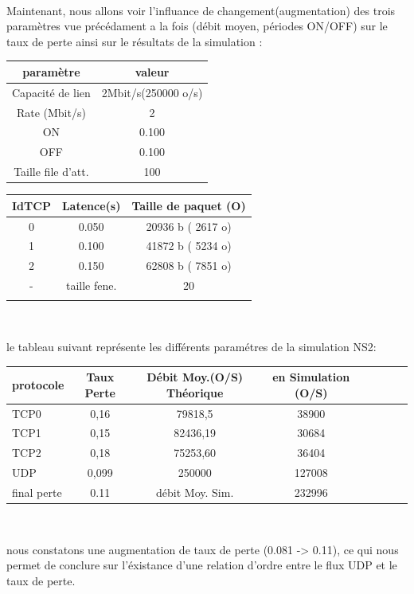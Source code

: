 \documentclass[a4paper]{report}
\theoremstyle{definition}
\begin{document}
\paragraph*{}
   Maintenant, nous allons voir l'influance de changement(augmentation)  des trois paramètres vue précédament a la fois (débit moyen, périodes ON/OFF) sur le taux de perte ainsi sur le résultats de la simulation : \\
   \begin{center}
   

\begin{tabular}{|c|c|}
\hline
 paramètre  & valeur \\ \hline
 
 Capacité de lien & 2Mbit/s(250000 o/s) \\ 
 Rate (Mbit/s) & 2 \\ 
 ON & 0.100  \\ 
 OFF & 0.100 \\ 
 Taille file d'att. & 100\\
\hline
\end{tabular}
\begin{tabular}{|c|c|c|}
\hline
 IdTCP  & Latence(s) & Taille de paquet (O) \\ \hline
 
 0 & 0.050 & 20936 b ( 2617 o)	 \\ 
 1 & 0.100 & 41872 b ( 5234 o)	 \\ 
 2 & 0.150 & 62808 b ( 7851 o)	 \\ 
 - & taille fene. & 20\\ 
 &&\\
\hline
\end{tabular}\\
   \end{center}
	le tableau suivant représente les différents paramétres de la simulation NS2:\\

\begin{center}


\begin{tabular}{|l|c|c|c|c|c|c|c|}
\hline
 protocole & Taux Perte & Débit Moy.(O/S) Théorique & en Simulation (O/S) \\ \hline
 TCP0 & 0,16 &  79818,5 &  38900     \\
 TCP1 & 0,15 &  82436,19 &  30684     \\ 
 TCP2 & 0,18 &  75253,60 &  36404     \\ 
 UDP  & 0,099 & 250000     &  127008 \\ 
 \hline
 final perte & 0.11  & débit Moy. Sim. & 232996   \\ 
\hline
\end{tabular}\\
\end{center}
nous constatons une augmentation de taux de perte (0.081 -> 0.11), ce qui nous permet de conclure sur l'éxistance d'une relation d'ordre entre le flux UDP et le taux de perte.
\end{document}
